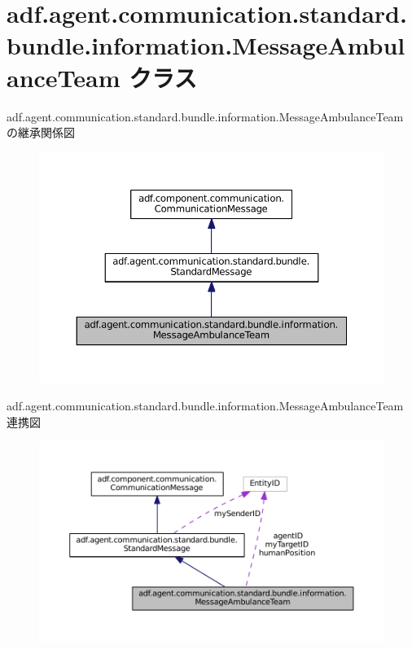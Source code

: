 \hypertarget{classadf_1_1agent_1_1communication_1_1standard_1_1bundle_1_1information_1_1MessageAmbulanceTeam}{}\section{adf.\+agent.\+communication.\+standard.\+bundle.\+information.\+Message\+Ambulance\+Team クラス}
\label{classadf_1_1agent_1_1communication_1_1standard_1_1bundle_1_1information_1_1MessageAmbulanceTeam}


adf.\+agent.\+communication.\+standard.\+bundle.\+information.\+Message\+Ambulance\+Team の継承関係図
\nopagebreak
\begin{figure}[H]
\begin{center}
\leavevmode
\includegraphics[width=350pt]{classadf_1_1agent_1_1communication_1_1standard_1_1bundle_1_1information_1_1MessageAmbulanceTeam__inherit__graph}
\end{center}
\end{figure}


adf.\+agent.\+communication.\+standard.\+bundle.\+information.\+Message\+Ambulance\+Team 連携図
\nopagebreak
\begin{figure}[H]
\begin{center}
\leavevmode
\includegraphics[width=350pt]{classadf_1_1agent_1_1communication_1_1standard_1_1bundle_1_1information_1_1MessageAmbulanceTeam__coll__graph}
\end{center}
\end{figure}
